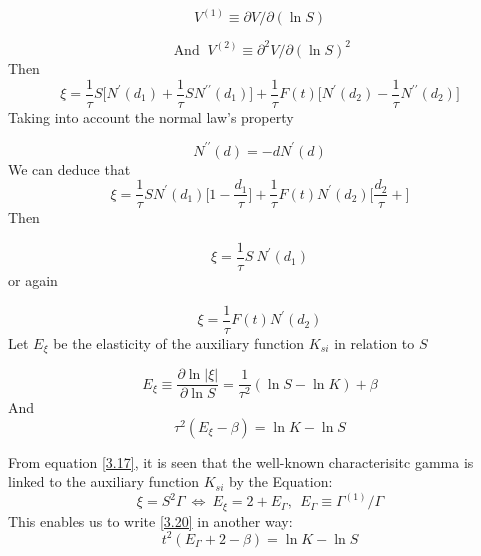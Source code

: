 \documentclass[a4 paper, 12pt]{report}
\theoremstyle{plain}
\begin{document}
\begin{equation}\label{3.12}
V^{(1)}\equiv\partial V/\partial(\ln S)
\end{equation}


\begin{equation}\label{3.13}
\mbox{  And  }~ V^{(2)}\equiv \partial^2 V/\partial (\ln S)^2
\end{equation}
Then
\begin{equation}\label{3.14}
\xi = \frac{1}{\tau}S\bigg[N^\prime(d_1)+\frac{1}{\tau}SN^{\prime\prime}(d_1)\bigg]+\frac{1}{\tau}F(t)\bigg[N^\prime(d_2) - \frac{1}{\tau}N^{\prime\prime}(d_2)\bigg]
\end{equation}
Taking into account the normal law's property

\begin{equation}\label{3.15}
N^{\prime\prime}(d) = -dN^\prime(d)
\end{equation}
We can deduce that
\begin{equation}\label{3.16}
\xi = \frac{1}{\tau}SN^\prime(d_1)\bigg[1-\frac{d_1}{\tau}\bigg]+\frac{1}{\tau}F(t)N^\prime(d_2)\bigg[\frac{d_2}{\tau}+\bigg]
\end{equation}
Then

\begin{equation}\label{3.17}
\xi = \frac{1}{\tau}S~N^\prime(d_1)
\end{equation}
or again

\begin{equation}\label{3.18}
\xi = \frac{1}{\tau}F(t)N^\prime(d_2)
\end{equation}
Let $E_\xi$ be the elasticity of the auxiliary function $K_{si}$ in relation to $S$


\begin{equation}\label{3.19}
E_\xi\equiv\frac{\partial\ln|\xi|}{\partial\ln S} = \frac{1}{\tau^2}(\ln S - \ln K)+\beta
\end{equation}
And
\begin{equation}\label{3.20}
\tau^2(E_\xi-\beta) = \ln K - \ln S
\end{equation}

From equation \eqref{3.17}, it is seen that the well-known characterisitc gamma is linked to the auxiliary function $K_{si}$ by the Equation:
$$
\xi = S^2\Gamma ~ \Leftrightarrow ~ E_\xi = 2+E_\Gamma,~~ E_\Gamma \equiv \Gamma^{(1)}/\Gamma
$$
This enables us to write \eqref{3.20} in another way:
\begin{equation}\label{3.21}
t^2(E_\Gamma+2-\beta) = \ln K - \ln S
\end{equation}
\end{document}
